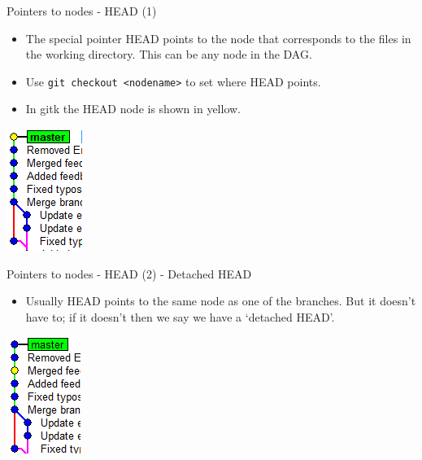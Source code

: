\documentclass[usenames,dvipsnames]{beamer}
\newcommand{\code}[1]{\colorbox{light-gray}{\texttt{#1}}}
\begin{document}
\begin{frame}{Pointers to nodes - HEAD (1)}
  \begin{block}{}
    \begin{itemize}
      \item{The special pointer HEAD points to the node that corresponds to the files in the working directory. This can be any node in the DAG.}
      \item{ Use \code{git checkout <nodename>} to set where HEAD points.}
      \item{In gitk the HEAD node is shown in yellow.}
    \end{itemize}
  \end{block}
  \begin{block}{}
    \begin{center}
      \includegraphics[scale=0.8]{Head.png}
    \end{center}
  \end{block}
\end{frame}

\begin{frame}{Pointers to nodes - HEAD (2) - Detached HEAD}
  \begin{block}{}
    \begin{itemize}
      \item{Usually HEAD points to the same node as one of the branches. But it doesn't have to; if it doesn't then we say we have a `detached HEAD'.}
    \end{itemize}
  \end{block}
  \begin{block}{}
    \begin{center}
      \includegraphics[scale=0.8]{DetachedHead.png}
    \end{center}
  \end{block}
\end{frame}
\end{document}
